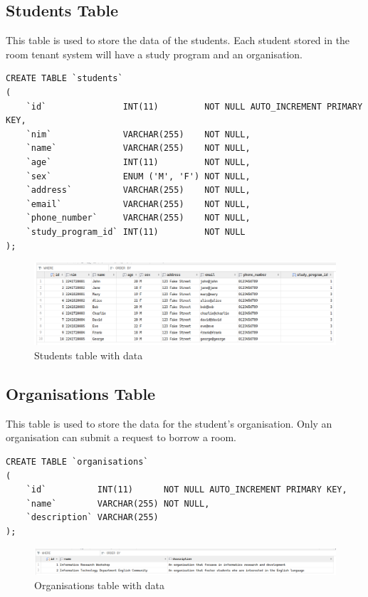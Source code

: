 \documentclass[12pt,titlepage]{article}
\begin{document}
\subsection{Students Table}
This table is used to store the data of the students. Each student stored in the room tenant system will have a study program
and an organisation.

\begin{verbatim}
CREATE TABLE `students`
(
    `id`               INT(11)         NOT NULL AUTO_INCREMENT PRIMARY KEY,
    `nim`              VARCHAR(255)    NOT NULL,
    `name`             VARCHAR(255)    NOT NULL,
    `age`              INT(11)         NOT NULL,
    `sex`              ENUM ('M', 'F') NOT NULL,
    `address`          VARCHAR(255)    NOT NULL,
    `email`            VARCHAR(255)    NOT NULL,
    `phone_number`     VARCHAR(255)    NOT NULL,
    `study_program_id` INT(11)         NOT NULL
);
\end{verbatim}

\begin{figure}[h]
    \centering
    \includegraphics[width=\textwidth]{./images/students-table.png}
    \caption{Students table with data}
\end{figure}

\pagebreak

\subsection{Organisations Table}
This table is used to store the data for the student's organisation. 
Only an organisation can submit a request to borrow a room.

\begin{verbatim}
CREATE TABLE `organisations`
(
    `id`          INT(11)      NOT NULL AUTO_INCREMENT PRIMARY KEY,
    `name`        VARCHAR(255) NOT NULL,
    `description` VARCHAR(255)
);
\end{verbatim}

\begin{figure}[h]
    \centering
    \includegraphics[width=\textwidth]{./images/organisations-table.png}
    \caption{Organisations table with data}
\end{figure}
\end{document}
